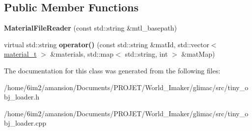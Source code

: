 \subsection*{Public Member Functions}
\begin{DoxyCompactItemize}
\item 
\mbox{\label{classtinyobj_1_1MaterialFileReader_a824d0100284310fe213d86ad443cc575}} 
{\bfseries Material\+File\+Reader} (const std\+::string \&mtl\+\_\+basepath)
\item 
\mbox{\label{classtinyobj_1_1MaterialFileReader_a9374212c9997aa8ac0d15d97f67b25f8}} 
virtual std\+::string {\bfseries operator()} (const std\+::string \&mat\+Id, std\+::vector$<$ \hyperlink{structtinyobj_1_1material__t}{material\+\_\+t} $>$ \&materials, std\+::map$<$ std\+::string, int $>$ \&mat\+Map)
\end{DoxyCompactItemize}


The documentation for this class was generated from the following files\+:\begin{DoxyCompactItemize}
\item 
/home/6im2/amansion/\+Documents/\+P\+R\+O\+J\+E\+T/\+World\+\_\+\+Imaker/glimac/src/tiny\+\_\+obj\+\_\+loader.\+h\item 
/home/6im2/amansion/\+Documents/\+P\+R\+O\+J\+E\+T/\+World\+\_\+\+Imaker/glimac/src/tiny\+\_\+obj\+\_\+loader.\+cpp\end{DoxyCompactItemize}
